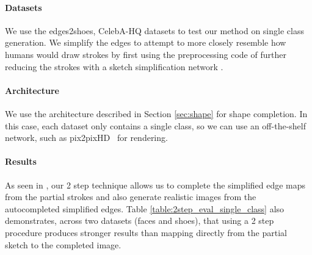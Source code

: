 \paragraph{Datasets} We use the edges2shoes\cite{isola2016image2image}, CelebA-HQ\cite{karras2017progressive} datasets to test our method on single class generation. 
We simplify the edges to attempt to more closely resemble how humans would draw strokes by first using the preprocessing code of \cite{li2019im2pencil} further reducing the strokes with a sketch simplification network \cite{simo2016learning}.
\paragraph{Architecture} We use the architecture described in Section \ref{sec:shape} for shape completion. In this case, each dataset only contains a single class, so we can use an off-the-shelf network, such as pix2pixHD~\cite{wang2017high} for rendering.

\paragraph{Results} As seen in , our 2 step technique allows us to complete the simplified edge maps from the partial strokes and also generate realistic images from the autocompleted simplified edges.
Table \ref{table:2step_eval_single_class} also demonstrates, across two datasets (faces and shoes), that using a 2 step procedure produces stronger results than mapping directly from the partial sketch to the completed image.

